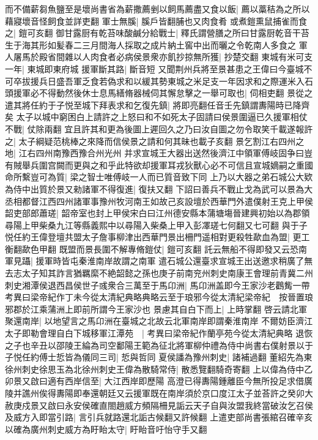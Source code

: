 而不備薪芻魚鹽至是壞尚書省為薪撒薦剉以飼馬薦盡又食以飯|{
	薦以藁秸為之所以藉寢壞音怪飼食並詳吏翻}
軍士無膎|{
	膎戶皆翻脯也又肉食肴}
或煮鎧熏鼠捕雀而食之|{
	鎧可亥翻}
御甘露厨有乾苔味酸鹹分給戰士|{
	釋氏謂營膳之所曰甘露厨乾音干苔生于海其形如髪春二三月間海人採取之成片納土窖中出而曬之令乾南人多食之}
軍人屠馬於殿省間雜以人肉食者必病侯景衆亦飢抄掠無所獲|{
	抄楚交翻}
東城有米可支一年|{
	東城即東府城}
援軍斷其路|{
	斷音短}
又聞荆州兵將至景甚患之王偉曰今臺城不可卒拔援兵日盛吾軍乏食若偽求和以緩其勢東城之米足支一年因求和之際運米入石頭援軍必不得動然後休士息馬繕脩器械伺其懈怠擊之一舉可取也|{
	伺相吏翻}
景從之遣其將任約于子悦至城下拜表求和乞復先鎮|{
	將即亮翻任音壬先鎮謂夀陽時已降齊矣}
太子以城中窮困白上請許之上怒曰和不如死太子固請曰侯景圍逼已久援軍相仗不戰|{
	仗除兩翻}
宜且許其和更為後圖上遲回久之乃曰汝自圖之勿令取笑千載遂報許之|{
	太子綱疑范桃棒之來降而信侯景之請和何其昧也載子亥翻}
景乞割江右四州之地|{
	江右四州南豫西豫合州光州}
并求宣城王大器出送然後濟江中領軍傅岐固争曰豈有賊舉兵圍宫闕而更與之和乎此特欲却援軍耳戎狄獸心必不可信且宣城嫡嗣之重國命所繫豈可為質|{
	梁之智士唯傅岐一人而已質音致下同}
上乃以大器之弟石城公大欵為侍中出質於景又勑諸軍不得復進|{
	復扶又翻}
下詔曰善兵不戰止戈為武可以景為大丞相都督江西四州諸軍事豫州牧河南王如故己亥設壇於西華門外遣僕射王克上甲侯韶吏部郎蕭瑳|{
	韶帝室也封上甲侯宋白曰江州德安縣本蒲塘塲晉建興初始以為郡領尋陽上甲柴桑九江等縣義熙中以尋陽入柴桑上甲入彭凙瑳七何翻又七可翻}
與于子悦任約王偉登壇共盟太子詹事柳津出西華門景出柵門遥相對更殺牲歃血為盟|{
	更工衡翻歃色甲翻}
既盟而景長圍不解專脩鎧仗|{
	鎧可亥翻}
託云無船不得即發又云恐南軍見躡|{
	援軍時皆屯秦淮南岸故謂之南軍}
遣石城公還臺求宣城王出送邀求稍廣了無去志太子知其詐言猶羈縻不絶韶懿之孫也庚子前南兖州刺史南康王會理前青冀二州刺史湘潭侯退西昌侯世子彧衆合三萬至于馬卬洲|{
	馬卬洲盖即今王家沙老鸛觜一帶　考異曰梁帝紀作丁未今從太清紀典略典略云至于琅邪今從太清紀梁帝紀　按晉置琅邪郡於江乘蒲洲上即前所謂今王家沙也}
景慮其自白下而上|{
	上時掌翻}
啓云請北軍聚還南岸|{
	以地望言之馬卬洲在臺城之北故云北軍南岸即謂秦淮南岸}
不爾妨臣濟江太子即勒會理自白下城移軍江潭苑　|{
	考異曰梁帝紀作蘭亭苑今從太清紀典略}
退恢之子也辛丑以邵陵王綸為司空鄱陽王範為征北將軍柳仲禮為侍中尚書右僕射景以于子悦任約傅士悊皆為儀同三司|{
	悊與哲同}
夏侯譒為豫州刺史|{
	諸補過翻}
董紹先為東徐州刺史徐思玉為北徐州刺史王偉為散騎常侍|{
	散悉覽翻騎奇寄翻}
上以偉為侍中乙卯景又啟曰適有西岸信至|{
	大江西岸即歷陽}
高澄已得夀陽鍾離臣今無所投足求借廣陵并譙州俟得夀陽即奉還朝廷又云援軍既在南岸須於京口度江太子並荅許之癸卯大赦庚戍景又啟曰永安侯確直閤趙威方頻隔柵見詬云天子自與汝盟我終當破汝乞召侯及威方入即當引路|{
	言引兵就路還北詬古候翻又許候翻}
上遣吏部尚書張綰召確辛亥以確為廣州刺史威方為盱眙太守|{
	盱眙音吁怡守手又翻}
